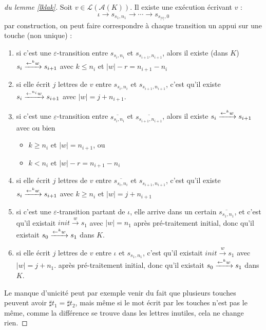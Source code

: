 \documentclass[12pt, a4paper]{article}
\renewcommand{\L}{\mathcal{L}}
\renewcommand{\bar}{\overline}
\newcommand{\A}{\mathcal{A}}
\begin{document}
    \begin{proof}[du lemme \ref{lklak}]
       Soit $v \in \L(\A(K))$. Il existe une exécution écrivant $v$ :
       \[ \iota \rightarrow s_{s_1,n_1} \rightarrow \cdots \rightarrow s_{s_{|v|},0} \]
       par construction, on peut faire correspondre à chaque transition un appui sur une touche (non unique) :
       \begin{enumerate}
        \item si c'est une $\varepsilon$-transition entre $s_{s_i, n_i}$ et $s_{s_{i+1},n_{i+1}}$, alors il existe (dans $K$) $s_i \xrightarrow{\mathord{\leftarrow}^{k}w} s_{i+1}$ avec $k \leqslant n_i$ et $|w| - r = n_{i+1} - n_i$
        \item si elle écrit $j$ lettres de $v$ entre $s_{s_i,n_i}$ et $s_{s_{i+1},n_{i+1}}$, c'est qu'il existe $s_i \xrightarrow{\mathord{\leftarrow}^{n_i}w} s_{i+1}$ avec $|w| = j + n_{i+1}$.
        \item si c'est une $\varepsilon$-transition entre $\bar{s_{s_i, n_i}}$ et $\bar{s_{s_{i+1},n_{i+1}}}$, alors il existe $s_i \xrightarrow{\mathord{\leftarrow}^{k}w} s_{i+1}$ avec ou bien
            \begin{itemize}
                \item $k \geqslant n_i$ et $|w| = n_{i+1}$, ou
                \item $k < n_i$ et $|w| - r = n_{i+1} - n_i$
            \end{itemize}
        \item si elle écrit $j$ lettres de $v$ entre $\bar{s_{s_i,n_i}}$ et $s_{s_{i+1},n_{i+1}}$, c'est qu'il existe $s_i \xrightarrow{\mathord{\leftarrow}^{k}w} s_{i+1}$ avec $k \geqslant n_i$ et $|w| = j + n_{i+1}$
        \item si c'est une $\varepsilon$-transition partant de $\iota$, elle arrive dans un certain $\bar{s_{s_1,n_1}}$, et c'est qu'il existait $init \xrightarrow{w} s_1$ avec $|w| = n_1$ après pré-traitement initial, donc qu'il existait $s_0 \xrightarrow{\mathord{\leftarrow}^kw} s_1$ dans $K$.
        \item si elle écrit $j$ lettres de $v$ entre $\iota$ et $s_{s_{1},n_{1}}$, c'est qu'il existait $init \xrightarrow{w} s_{1}$ avec $|w| = j + n_{1}$. après pré-traitement initial, donc qu'il existait $s_0 \xrightarrow{\mathord{\leftarrow}^kw} s_1$ dans $K$.
       \end{enumerate}
       Le manque d'unicité peut par exemple venir du fait que plusieurs touches peuvent avoir $\sharp t_1 = \sharp t_2$, mais même si le mot écrit par les touches n'est pas le même, comme la différence se trouve dans les lettres inutiles, cela ne change rien.


\end{proof}
\end{document}
